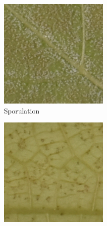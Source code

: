 \documentclass[english]{article}
\begin{document}
\begin{figure}[H]
	\centering
	\begin{subfigure}[b]{0.2\linewidth}
		\includegraphics[width=\linewidth]{Exp21DM01_inoc1_T6_P24_c_2.png}
		\caption{Sporulation}\label{fig:sporulation}
	\end{subfigure}
	\begin{subfigure}[b]{0.2\linewidth}
		\includegraphics[width=\linewidth]{Exp20DM01_inoc1_T6_P17_c_1.png}

\end{subfigure}
\end{figure}
\end{document}

